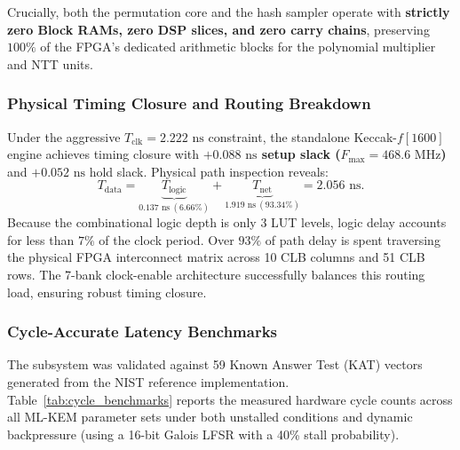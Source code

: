 Crucially, both the permutation core and the hash sampler operate with \textbf{strictly zero Block RAMs, zero DSP slices, and zero carry chains}, preserving $100\%$ of the FPGA's dedicated arithmetic blocks for the polynomial multiplier and NTT units.

\subsubsection{Physical Timing Closure and Routing Breakdown}
Under the aggressive $T_{\text{clk}} = 2.222\text{ ns}$ constraint, the standalone Keccak-$f[1600]$ engine achieves timing closure with \textbf{$+0.088\text{ ns}$ setup slack ($F_{\max} = 468.6\text{ MHz}$)} and $+0.052\text{ ns}$ hold slack. Physical path inspection reveals:
\begin{equation}
T_{\text{data}} = \underbrace{T_{\text{logic}}}_{0.137\text{ ns} \ (6.66\%)} + \underbrace{T_{\text{net}}}_{1.919\text{ ns} \ (93.34\%)} = 2.056\text{ ns}.
\label{eq:timing_split}
\end{equation}
Because the combinational logic depth is only 3 LUT levels, logic delay accounts for less than $7\%$ of the clock period. Over $93\%$ of path delay is spent traversing the physical FPGA interconnect matrix across 10 CLB columns and 51 CLB rows. The 7-bank clock-enable architecture successfully balances this routing load, ensuring robust timing closure.

\subsubsection{Cycle-Accurate Latency Benchmarks}
The subsystem was validated against 59 Known Answer Test (\mbox{KAT}) vectors generated from the NIST reference implementation. Table~\ref{tab:cycle_benchmarks} reports the measured hardware cycle counts across all \mbox{ML-KEM} parameter sets under both unstalled conditions and dynamic backpressure (using a 16-bit Galois LFSR with a 40\% stall probability).

